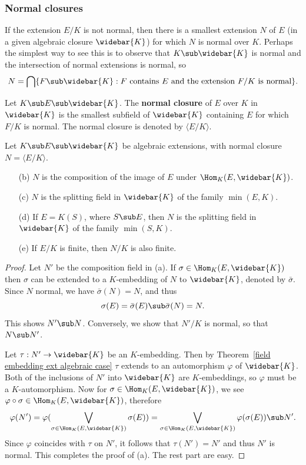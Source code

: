 \subsubsection{Normal closures}
If the extension $E/K$ is not normal, then there is a smallest extension $N$ of $E$ (in a given algebraic closure $\widebar{K}$) for which $N$ is normal over $K$. Perhaps the simplest way to see this is to observe that $K\sub\widebar{K}$ is normal and the intersection of normal extensions is normal, so
\[N=\bigcap\{F\sub\widebar{K}:\text{$F$ contains $E$ and the extension $F/K$ is normal}\}.\]
\begin{definition}
Let $K\sub E\sub\widebar{K}$. The \textbf{normal closure} of $E$ over $K$ in $\widebar{K}$ is the smallest subfield of $\widebar{K}$ containing $E$ for which $F/K$ is normal. The normal closure is denoted by $\langle E/K\rangle$.
\end{definition}
\begin{theorem}\label{field extension normal closure char}
Let $K\sub E\sub\widebar{K}$ be algebraic extensions, with normal closure $N=\langle E/K\rangle$.
\begin{itemize}
\item[(b)] $N$ is the composition of the image of $E$ under $\Hom_K(E,\widebar{K})$. 
\item[(c)] $N$ is the splitting field in $\widebar{K}$ of the family $\min(E,K)$.
\item[(d)] If $E=K(S)$, where $S\sub E$, then $N$ is the splitting field in $\widebar{K}$ of the family $\min(S,K)$.
\item[(e)] If $E/K$ is finite, then $N/K$ is also finite.
\end{itemize}
\end{theorem}
\begin{proof}
Let $N'$ be the composition field in (a). If $\sigma\in\Hom_{K}(E,\widebar{K})$ then $\sigma$ can be extended to a $K$-embedding of $N$ to $\widebar{K}$, denoted by $\bar{\sigma}$. Since $N$ normal, we have $\bar{\sigma}(N)=N$, and thus
\[\sigma(E)=\bar{\sigma}(E)\sub\bar{\sigma}(N)=N.\]
This shows $N'\sub N$. Conversely, we show that $N'/K$ is normal, so that $N\sub N'$.\par
Let $\tau:N'\to\widebar{K}$ be an $K$-embedding. Then by Theorem~\ref{field embedding ext algebraic case} $\tau$ extends to an automorphism $\varphi$ of $\widebar{K}$. Both of the inclusions of $N'$ into $\widebar{K}$ are $K$-embeddings, so $\varphi$ must be a $K$-automorphism. Now for $\sigma\in\Hom_K(E,\widebar{K})$, we see $\varphi\circ\sigma\in\Hom_K(E,\widebar{K})$, therefore
\[\varphi(N')=\varphi(\bigvee_{\sigma\in\Hom_K(E,\widebar{K})}\sigma(E))=\bigvee_{\sigma\in\Hom_K(E,\widebar{K})}\varphi(\sigma(E))\sub N'.\]
Since $\varphi$ coincides with $\tau$ on $N'$, it follows that $\tau(N')=N'$ and thus $N'$ is normal. This completes the proof of (a). The rest part are easy.
\end{proof}
